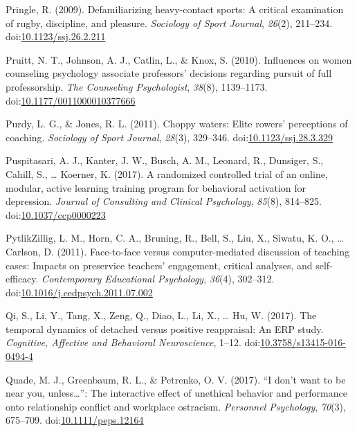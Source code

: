 \documentclass[english,man]{apa6}
\theoremstyle{definition}
\theoremstyle{definition}
\theoremstyle{definition}
\theoremstyle{remark}
\begin{document}
\hypertarget{ref-Pringle2009}{}
Pringle, R. (2009). Defamiliarizing heavy-contact sports: A critical
examination of rugby, discipline, and pleasure. \emph{Sociology of Sport
Journal}, \emph{26}(2), 211--234.
doi:\href{https://doi.org/10.1123/ssj.26.2.211}{10.1123/ssj.26.2.211}

\hypertarget{ref-Pruitt2010}{}
Pruitt, N. T., Johnson, A. J., Catlin, L., \& Knox, S. (2010).
Influences on women counseling psychology associate professors'
decisions regarding pursuit of full professorship. \emph{The Counseling
Psychologist}, \emph{38}(8), 1139--1173.
doi:\href{https://doi.org/10.1177/0011000010377666}{10.1177/0011000010377666}

\hypertarget{ref-Purdy2011}{}
Purdy, L. G., \& Jones, R. L. (2011). Choppy waters: Elite rowers'
perceptions of coaching. \emph{Sociology of Sport Journal},
\emph{28}(3), 329--346.
doi:\href{https://doi.org/10.1123/ssj.28.3.329}{10.1123/ssj.28.3.329}

\hypertarget{ref-Puspitasari2017a}{}
Puspitasari, A. J., Kanter, J. W., Busch, A. M., Leonard, R., Dunsiger,
S., Cahill, S., \ldots{} Koerner, K. (2017). A randomized controlled
trial of an online, modular, active learning training program for
behavioral activation for depression. \emph{Journal of Consulting and
Clinical Psychology}, \emph{85}(8), 814--825.
doi:\href{https://doi.org/10.1037/ccp0000223}{10.1037/ccp0000223}

\hypertarget{ref-PytlikZillig2011}{}
PytlikZillig, L. M., Horn, C. A., Bruning, R., Bell, S., Liu, X.,
Siwatu, K. O., \ldots{} Carlson, D. (2011). Face-to-face versus
computer-mediated discussion of teaching cases: Impacts on preservice
teachers' engagement, critical analyses, and self-efficacy.
\emph{Contemporary Educational Psychology}, \emph{36}(4), 302--312.
doi:\href{https://doi.org/10.1016/j.cedpsych.2011.07.002}{10.1016/j.cedpsych.2011.07.002}

\hypertarget{ref-Qi2017}{}
Qi, S., Li, Y., Tang, X., Zeng, Q., Diao, L., Li, X., \ldots{} Hu, W.
(2017). The temporal dynamics of detached versus positive reappraisal:
An ERP study. \emph{Cognitive, Affective and Behavioral Neuroscience},
1--12.
doi:\href{https://doi.org/10.3758/s13415-016-0494-4}{10.3758/s13415-016-0494-4}

\hypertarget{ref-Quade2017}{}
Quade, M. J., Greenbaum, R. L., \& Petrenko, O. V. (2017). ``I don't
want to be near you, unless\ldots{}'': The interactive effect of
unethical behavior and performance onto relationship conflict and
workplace ostracism. \emph{Personnel Psychology}, \emph{70}(3),
675--709.
doi:\href{https://doi.org/10.1111/peps.12164}{10.1111/peps.12164}
\end{document}
